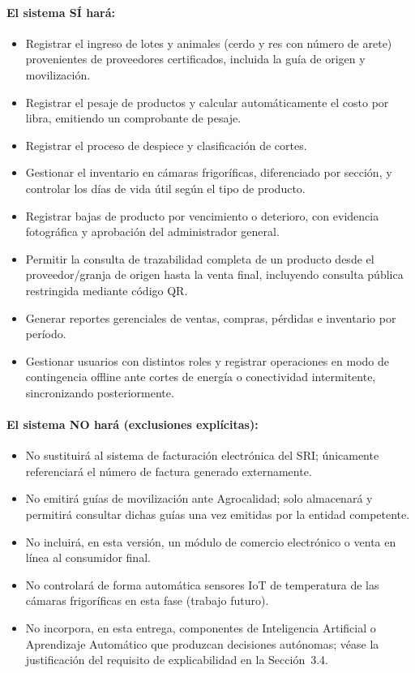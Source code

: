 \documentclass[11pt,a4paper]{article}
\begin{document}
\paragraph{El sistema SÍ hará:}
\begin{itemize}[nosep]
\item Registrar el ingreso de lotes y animales (cerdo y res con número de arete) provenientes de proveedores certificados, incluida la guía de origen y movilización.
\item Registrar el pesaje de productos y calcular automáticamente el costo por libra, emitiendo un comprobante de pesaje.
\item Registrar el proceso de despiece y clasificación de cortes.
\item Gestionar el inventario en cámaras frigoríficas, diferenciado por sección, y controlar los días de vida útil según el tipo de producto.
\item Registrar bajas de producto por vencimiento o deterioro, con evidencia fotográfica y aprobación del administrador general.
\item Permitir la consulta de trazabilidad completa de un producto desde el proveedor/granja de origen hasta la venta final, incluyendo consulta pública restringida mediante código QR.
\item Generar reportes gerenciales de ventas, compras, pérdidas e inventario por período.
\item Gestionar usuarios con distintos roles y registrar operaciones en modo de contingencia offline ante cortes de energía o conectividad intermitente, sincronizando posteriormente.
\end{itemize}

\paragraph{El sistema NO hará (exclusiones explícitas):}
\begin{itemize}[nosep]
\item No sustituirá al sistema de facturación electrónica del SRI; únicamente referenciará el número de factura generado externamente.
\item No emitirá guías de movilización ante Agrocalidad; solo almacenará y permitirá consultar dichas guías una vez emitidas por la entidad competente.
\item No incluirá, en esta versión, un módulo de comercio electrónico o venta en línea al consumidor final.
\item No controlará de forma automática sensores IoT de temperatura de las cámaras frigoríficas en esta fase (trabajo futuro).
\item No incorpora, en esta entrega, componentes de Inteligencia Artificial o Aprendizaje Automático que produzcan decisiones autónomas; véase la justificación del requisito de explicabilidad en la Sección~3.4.
\end{itemize}
\end{document}
